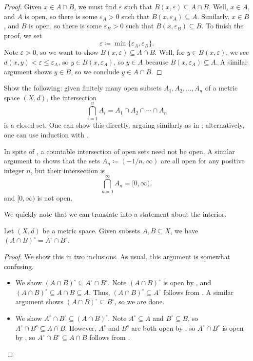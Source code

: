 \documentclass[../main.tex]{subfiles}
\begin{document}
\begin{proof}
    Given $x\in A\cap B$, we must find $\varepsilon$ such that $B(x,\varepsilon)\subseteq A\cap B$. Well, $x\in A$, and $A$ is open, so there is some $\varepsilon_A>0$ such that $B(x,\varepsilon_A)\subseteq A$. Similarly, $x\in B$, and $B$ is open, so there is some $\varepsilon_B>0$ such that $B(x,\varepsilon_B)\subseteq B$. To finish the proof, we set
    \[\varepsilon\coloneqq\min\{\varepsilon_A,\varepsilon_B\}.\]
    Note $\varepsilon>0$, so we want to show $B(x,\varepsilon)\subseteq A\cap B$. Well, for $y\in B(x,\varepsilon)$, we see $d(x,y)<\varepsilon\le\varepsilon_A$, so $y\in B(x,\varepsilon_A)$, so $y\in A$ because $B(x,\varepsilon_A)\subseteq A$. A similar argument shows $y\in B$, so we conclude $y\in A\cap B$.
\end{proof}
\begin{exe} \label{exe:finite-intersect-open-sets}
    Show the following: given finitely many open subsets $A_1,A_2,\ldots,A_n$ of a metric space $(X,d)$, the intersection
    \[\bigcap_{i=1}^nA_i=A_1\cap A_2\cap\cdots\cap A_n\]
    is a closed set. One can show this directly, arguing similarly as in ; alternatively, one can use induction with .
\end{exe}
\begin{nex}
    In spite of , a countable intersection of open sets need not be open. A similar argument to  shows that the sets $A_n\coloneqq(-1/n,\infty)$ are all open for any positive integer $n$, but their intersection is
    \[\bigcap_{n=1}^\infty A_n=[0,\infty),\]
    and $[0,\infty)$ is not open.
\end{nex}
We quickly note that we can translate  into a statement about the interior.
\begin{corollary} \label{cor:int-intersection}
    Let $(X,d)$ be a metric space. Given subsets $A,B\subseteq X$, we have $(A\cap B)^\circ=A^\circ\cap B^\circ$.
\end{corollary}
\begin{proof}
    We show this in two inclusions. As usual, this argument is somewhat confusing.
    \begin{itemize}
        \item We show $(A\cap B)^\circ\subseteq A^\circ\cap B^\circ$. Note $(A\cap B)^\circ$ is open by , and $(A\cap B)^\circ\subseteq A\cap B\subseteq A$. Thus, $(A\cap B)^\circ\subseteq A^\circ$ follows from . A similar argument shows $(A\cap B)^\circ\subseteq B^\circ$, so we are done.
        \item We show $A^\circ\cap B^\circ\subseteq(A\cap B)^\circ$. Note $A^\circ\subseteq A$ and $B^\circ\subseteq B$, so $A^\circ\cap B^\circ\subseteq A\cap B$. However, $A^\circ$ and $B^\circ$ are both open by , so $A^\circ\cap B^\circ$ is open by , so $A^\circ\cap B^\circ\subseteq A\cap B$ follows from .
        \qedhere
    \end{itemize}
\end{proof}
\end{document}

